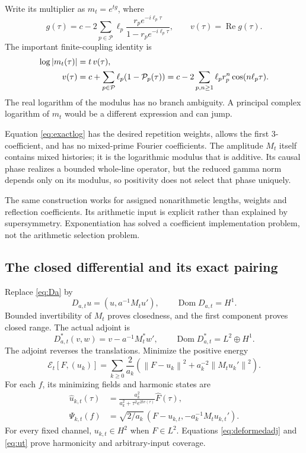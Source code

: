\documentclass[11pt]{article}
\numberwithin{equation}{section}
\theoremstyle{definition}
\theoremstyle{remark}
\newcommand{\Dom}{\operatorname{Dom}}
\newcommand{\re}{\operatorname{Re}}
\newcommand{\norm}[1]{\left\lVert#1\right\rVert}
\begin{document}
Write its multiplier as $m_t=e^{tg}$, where
\begin{equation}
 g(\tau)=c-2\sum_{p\in\mathcal P}
 \ell_p\frac{r_pe^{-i\ell_p\tau}}{1-r_pe^{-i\ell_p\tau}},
 \qquad v(\tau)=\re g(\tau).
 \label{eq:g}
\end{equation}
The important finite-coupling identity is
\begin{align}
 \log|m_t(\tau)|&=t\,v(\tau),\notag\\
 v(\tau)&=c+\sum_{p\in\mathcal P}\ell_p(1-\mathcal P_p(\tau))
 =c-2\sum_{p,n\ge1}\ell_pr_p^n\cos(n\ell_p\tau).
 \label{eq:exactlog}
\end{align}
The real logarithm of the modulus has no branch ambiguity. A principal complex logarithm of $m_t$ would be a different expression and can jump.

Equation \eqref{eq:exactlog} has the desired repetition weights, allows the first 3-coefficient, and has no mixed-prime Fourier coefficients. The amplitude $M_t$ itself contains mixed histories; it is the logarithmic modulus that is additive. Its causal phase realizes a bounded whole-line operator, but the reduced gamma norm depends only on its modulus, so positivity does not select that phase uniquely.

The same construction works for assigned nonarithmetic lengths, weights and reflection coefficients. Its arithmetic input is explicit rather than explained by supersymmetry. Exponentiation has solved a coefficient implementation problem, not the arithmetic selection problem.

\subsection{The closed differential and its exact pairing}
Replace \eqref{eq:Da} by
\begin{equation}
 D_{a,t}u=(u,a^{-1}M_tu'),\qquad\Dom D_{a,t}=H^1.
\end{equation}
Bounded invertibility of $M_t$ proves closedness, and the first component proves closed range. The actual adjoint is
\begin{equation}
 D_{a,t}^*(v,w)=v-a^{-1}M_t^*w',
 \qquad\Dom D_{a,t}^*=L^2\oplus H^1.
 \label{eq:deformedadj}
\end{equation}
The adjoint reverses the translations. Minimize the positive energy
\begin{equation}
 \mathcal E_t[F,(u_k)]
 =\sum_{k\ge0}\frac2{a_k}
 \left(\norm{F-u_k}^2+a_k^{-2}\norm{M_tu_k'}^2\right).
 \label{eq:Et}
\end{equation}
For each $f$, its minimizing fields and harmonic states are
\begin{align}
 \widehat u_{k,t}(\tau)&=
 \frac{a_k^2}{a_k^2+\tau^2e^{2tv(\tau)}}\widehat F(\tau),\label{eq:ut}\\
 \Psi_{k,t}(f)&=\sqrt{2/a_k}\,(F-u_{k,t},-a_k^{-1}M_tu_{k,t}').
\end{align}
For every fixed channel, $u_{k,t}\in H^2$ when $F\in L^2$. Equations \eqref{eq:deformedadj} and \eqref{eq:ut} prove harmonicity and arbitrary-input coverage.
\end{document}
